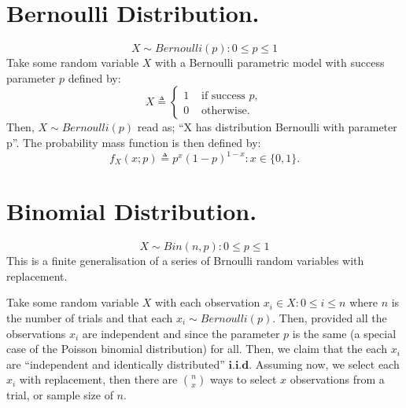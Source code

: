 




%

\section{Bernoulli Distribution.}
\begin{equation}\label{eqn:bernoullidist}
 \boxed{X \sim Bernoulli (p) : 0 \leq p \leq 1}
\end{equation}
Take some random variable $X$ with a Bernoulli parametric model with success parameter $p$ defined by:
\begin{displaymath}
   X \triangleq \left\{
     \begin{array}{lr}
       1 & \mbox{ if success } p, \\
       0 & \mbox{ otherwise.}
     \end{array}
   \right.
\end{displaymath} 
Then, $X \sim Bernoulli (p)$ read as; ``X has distribution Bernoulli with parameter p''.
The probability mass function is then defined by:
\begin{equation}\label{eqn:bernoulli}
 \boxed{f_{X}(x; p) \triangleq p^{x}(1 - p)^{1 - x} : x \in \{0, 1\}.}
\end{equation}

\section{Binomial Distribution.}
\begin{equation}\label{eqn:bindist}
 \boxed{X \sim Bin(n, p) : 0 \leq p \leq 1}
\end{equation}
This is a finite generalisation of a series of Brnoulli random variables with replacement.

Take some random variable $X$ with each observation $x_{i} \in X : 0 \leq i \leq n$ where $n$ is the number of trials and that each $x_{i} \sim Bernoulli (p)$.
Then, provided all the observations $x_{i}$ are independent and since the parameter $p$ is the same (a special case of the Poisson binomial distribution) for all.
Then, we claim that the each $x_{i}$ are ``independent and identically distributed'' $\textbf{i.i.d}$.
Assuming now, we select each $x_{i}$ with replacement, then there are $n \choose x$ ways to select $x$ observations from a trial, or sample size of $n$.

